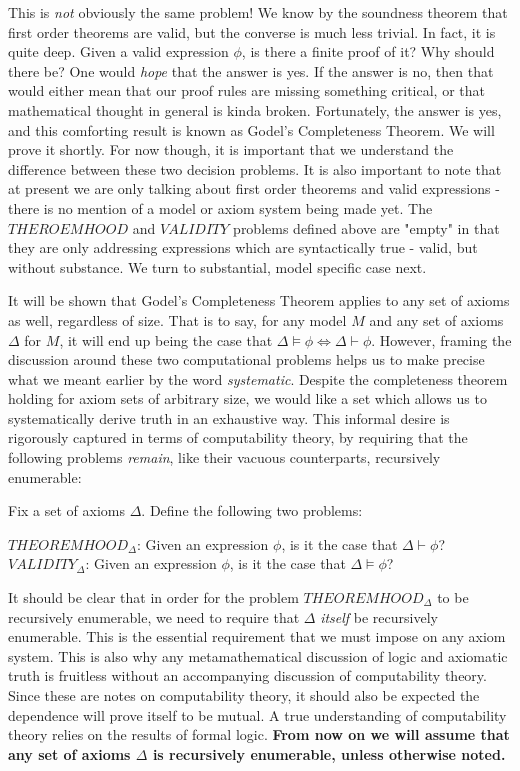 This is \textit{not} obviously the same problem! We know by the soundness theorem that first order theorems are valid, but the converse is much less trivial. In fact, it is quite deep. Given a valid expression $\phi$, is there a finite proof of it? Why should there be? One would \textit{hope} that the answer is yes. If the answer is no, then that would either mean that our proof rules are missing something critical, or that mathematical thought in general is kinda broken. Fortunately, the answer is yes, and this comforting result is known as Godel's Completeness Theorem. We will prove it shortly. For now though, it is important that we understand the difference between these two decision problems. It is also important to note that at present we are only talking about first order theorems and valid expressions - there is no mention of a model or axiom system being made yet. The $THEROEMHOOD$ and $VALIDITY$ problems defined above are "empty" in that they are only addressing expressions which are syntactically true - valid, but without substance. We turn to substantial, model specific case next.
\par It will be shown that Godel's Completeness Theorem applies to any set of axioms as well, regardless of size. That is to say, for any model $M$ and any set of axioms $\Delta$ for $M$, it will end up being the case that $\Delta \models \phi \iff \Delta \vdash \phi$. However, framing the discussion around these two computational problems helps us to make precise what we meant earlier by the word \textit{systematic}. Despite the completeness theorem holding for axiom sets of arbitrary size, we would like a set which allows us to systematically derive truth in an exhaustive way. This informal desire is rigorously captured in terms of computability theory, by requiring that the following problems \textit{remain}, like their vacuous counterparts, recursively enumerable:
\begin{problem}
    Fix a set of axioms $\Delta$. Define the following two problems:
    \begin{center}
        $THEOREMHOOD_{\Delta}$: Given an expression $\phi$, is it the case that $\Delta \vdash \phi$? \\
        $VALIDITY_{\Delta}$: Given an expression $\phi$, is it the case that $\Delta \models \phi$?
    \end{center}
\end{problem}
It should be clear that in order for the problem $THEOREMHOOD_{\Delta}$ to be recursively enumerable, we need to require that $\Delta$ \textit{itself} be recursively enumerable. This is the essential requirement that we must impose on any axiom system. This is also why any metamathematical discussion of logic and axiomatic truth is fruitless without an accompanying discussion of computability theory. Since these are notes on computability theory, it should also be expected the dependence will prove itself to be mutual. A true understanding of computability theory relies on the results of formal logic. \textbf{From now on we will assume that any set of axioms $\Delta$ is recursively enumerable, unless otherwise noted.}
